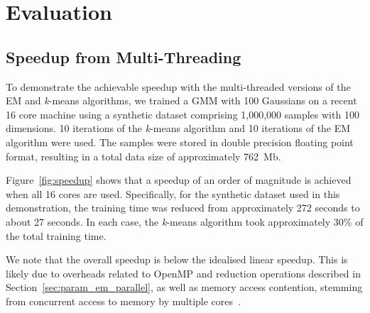 \section{Evaluation}
\label{sec:eval}

\subsection{Speedup from Multi-Threading}

To demonstrate the achievable speedup with the multi-threaded versions of the EM and {\it k}-means algorithms,
we trained a GMM with 100 Gaussians on a recent 16 core machine using a synthetic dataset comprising 1,000,000 samples with 100 dimensions.
10 iterations of the {\it k}-means algorithm and 10 iterations of the EM algorithm were used.
The samples were stored in double precision floating point format, resulting in a total data size of approximately 762~Mb.

Figure~\ref{fig:speedup} shows that a speedup of an order of magnitude is achieved when all 16 cores are used.
Specifically, for the synthetic dataset used in this demonstration,
the training time was reduced from approximately 272 seconds to about 27 seconds.
In each case, the {\it k}-means algorithm took approximately 30\% of the total training time.

We note that the overall speedup is below the idealised linear speedup.
This is likely due to overheads related to OpenMP and reduction operations described in Section~\ref{sec:param_em_parallel},
as well as memory access contention, stemming from concurrent access to memory by multiple cores~\cite{McCool_2012}.

